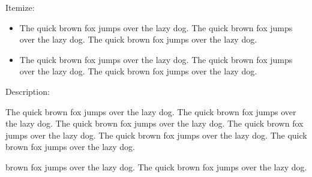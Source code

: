 \documentclass{article}
\begin{document}
Itemize:
\begin{itemize}[wide, labelwidth=!, labelindent=0pt, noitemsep]
  \item The quick brown fox jumps over the lazy dog. The quick brown fox jumps over the lazy dog. The quick brown fox jumps over the lazy dog.
  \item The quick brown fox jumps over the lazy dog. The quick brown fox jumps over the lazy dog. The quick brown fox jumps over the lazy dog.
\end{itemize}


Description:
\begin{description}[wide, labelwidth=!, labelindent=0pt, noitemsep]
  \item[The] The quick brown fox jumps over the lazy dog. The quick brown fox jumps over the lazy dog. The quick brown fox jumps over the lazy dog. The quick brown fox jumps over the lazy dog. The quick brown fox jumps over the lazy dog. The quick brown fox jumps over the lazy dog. 
  \item[Quick] brown fox jumps over the lazy dog.  The quick brown fox jumps over the lazy dog.
\end{description}
\end{document}
